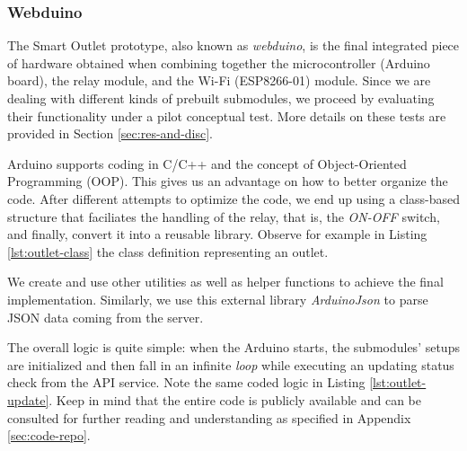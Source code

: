 \subsubsection{Webduino}
The Smart Outlet prototype, also known as \emph{webduino}, is the final integrated piece of hardware obtained when combining together the microcontroller (Arduino board), the relay module, and the Wi-Fi (ESP8266-01) module. Since we are dealing with different kinds of prebuilt  submodules, we proceed by evaluating their functionality under a pilot conceptual test. More details on these tests are provided in Section \ref{sec:res-and-disc}.

Arduino supports coding in C/C++ and the concept of Object-Oriented Programming (OOP). This gives us an advantage on how to better organize the code. After different attempts to optimize the code, we end up using a class-based structure that faciliates the handling of the relay, that is, the \textit{ON-OFF} switch, and finally, convert it into a reusable library. Observe for example in Listing \ref{lst:outlet-class} the class definition representing an outlet.


We create and use other utilities as well as helper functions to achieve the final implementation. Similarly, we use this external library  \textit{ArduinoJson} to parse JSON data coming from the server.

The overall logic is quite simple: when the Arduino starts, the submodules' setups are initialized and then fall in an infinite \emph{loop} while executing an updating status check from the API service. Note the same coded logic in Listing \ref{lst:outlet-update}. Keep in mind that the entire code is publicly available and can be consulted for further reading and understanding as specified in Appendix \ref{sec:code-repo}.


